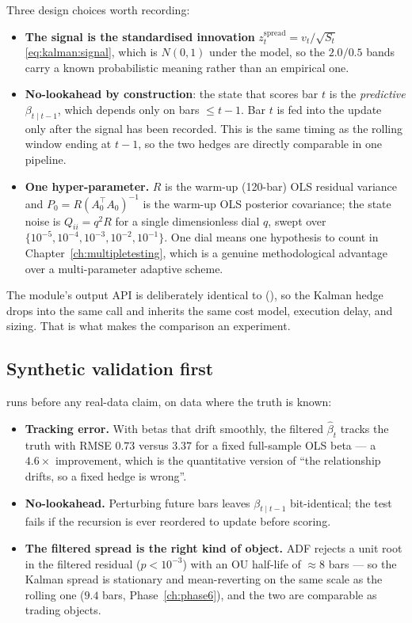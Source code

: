 Three design choices worth recording:
\begin{itemize}
  \item \textbf{The signal is the standardised innovation} $z^{\text{spread}}_t=v_t/\sqrt{S_t}$
    \eqref{eq:kalman:signal}, which is $N(0,1)$ under the model, so the $2.0/0.5$ bands
    carry a known probabilistic meaning rather than an empirical one.
  \item \textbf{No-lookahead by construction}: the state that scores bar $t$ is the
    \emph{predictive} $\beta_{t\mid t-1}$, which depends only on bars $\le t-1$. Bar $t$
    is fed into the update only after the signal has been recorded. This is the same
    timing as the rolling window ending at $t-1$, so the two hedges are directly
    comparable in one pipeline.
  \item \textbf{One hyper-parameter.} $R$ is the warm-up (120-bar) OLS residual variance
    and $P_0=R(A_0^{\top}A_0)^{-1}$ is the warm-up OLS posterior covariance; the state
    noise is $Q_{ii}=q^2R$ for a single dimensionless dial $q$, swept over
    $\{10^{-5},10^{-4},10^{-3},10^{-2},10^{-1}\}$. One dial means one hypothesis to count
    in Chapter~\ref{ch:multipletesting}, which is a genuine methodological advantage over
    a multi-parameter adaptive scheme.
\end{itemize}
The module's output API is deliberately identical to
 (), so the Kalman hedge
drops into the same  call and inherits the same cost model, execution
delay, and sizing. That is what makes the comparison an experiment.

\subsection{Synthetic validation first}

 runs before any real-data claim, on data where the truth is
known:
\begin{itemize}
  \item \textbf{Tracking error.} With betas that drift smoothly, the filtered
    $\hat\beta_t$ tracks the truth with RMSE $\mathbf{0.73}$ versus $\mathbf{3.37}$ for a
    fixed full-sample OLS beta --- a $4.6\times$ improvement, which is the quantitative
    version of ``the relationship drifts, so a fixed hedge is wrong''.
  \item \textbf{No-lookahead.} Perturbing future bars leaves $\beta_{t\mid t-1}$
    bit-identical; the test fails if the recursion is ever reordered to update before
    scoring.
  \item \textbf{The filtered spread is the right kind of object.} ADF rejects a unit root
    in the filtered residual ($p<10^{-3}$) with an OU half-life of $\approx8$ bars --- so
    the Kalman spread is stationary and mean-reverting on the same scale as the rolling one
    ($9.4$ bars, Phase~\ref{ch:phase6}), and the two are comparable as trading objects.
\end{itemize}


